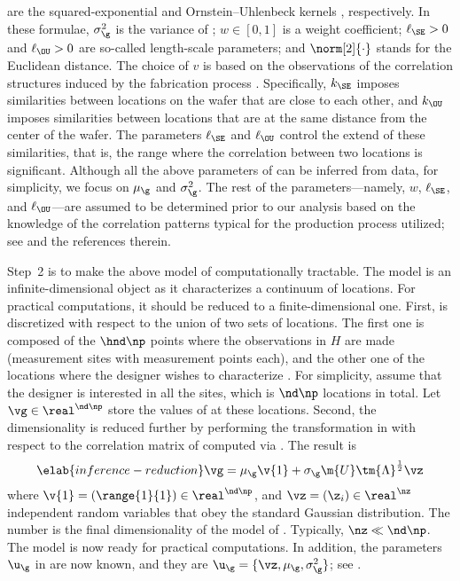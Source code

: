 are the squared-exponential and Ornstein--Uhlenbeck kernels
\cite{rasmussen2006}, respectively. In these formulae, $\sigma_\g^2$ is the
variance of \g; $w \in [0, 1]$ is a weight coefficient; $\ell_\SE > 0$ and
$\ell_\OU > 0$ are so-called length-scale parameters; and $\norm[2]{\cdot}$
stands for the Euclidean distance. The choice of $v$ is based on the
observations of the correlation structures induced by the fabrication process
\cite{chandrakasan2000, cheng2011}. Specifically, $k_\SE$ imposes similarities
between locations on the wafer that are close to each other, and $k_\OU$ imposes
similarities between locations that are at the same distance from the center of
the wafer. The parameters $\ell_\SE$ and $\ell_\OU$ control the extend of these
similarities, that is, the range where the correlation between two locations is
significant. Although all the above parameters of \g can be inferred from data,
for simplicity, we focus on $\mu_\g$ and $\sigma_\g^2$. The rest of the
parameters---namely, $w$, $\ell_\SE$, and $\ell_\OU$---are assumed to be
determined prior to our analysis based on the knowledge of the correlation
patterns typical for the production process utilized; see \cite{marzouk2009} and
the references therein.

Step~2 is to make the above model of \g computationally tractable. The model is
an infinite-dimensional object as it characterizes a continuum of locations. For
practical computations, it should be reduced to a finite-dimensional one. First,
\g is discretized with respect to the union of two sets of locations. The first
one is composed of the $\hnd \np$ points where the observations in $H$ are made
(\hnd measurement sites with \np measurement points each), and the other one of
the locations where the designer wishes to characterize \g. For simplicity,
assume that the designer is interested in all the sites, which is $\nd \np$
locations in total. Let $\vg \in \real^{\nd \np}$ store the values of \g at
these locations. Second, the dimensionality is reduced further by performing the
transformation in  with respect to the correlation
matrix of \vg computed via . The result is
\begin{equation} \elab{inference-reduction}
  \vg = \mu_\g \v{1} + \sigma_\g \m{U} \tm{\Lambda}^\frac{1}{2} \vz
\end{equation}
where $\v{1} = (\range{1}{1}) \in \real^{\nd \np}$, and $\vz = (\z_i) \in
\real^\nz$ independent random variables that obey the standard Gaussian
distribution. The number \nz is the final dimensionality of the model of \g.
Typically, $\nz \ll \nd \np$. The model is now ready for practical computations.
In addition, the parameters $\u_\g$ in  are now
known, and they are $\u_\g = \{ \vz, \mu_\g, \sigma^2_\g \}$; see
.

